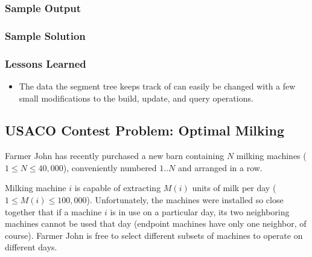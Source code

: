 \subsubsection{Sample Output}


\subsubsection{Sample Solution}




\subsubsection{Lessons Learned}

\begin{itemize}
    \item The data the segment tree keeps track of can easily be changed with a few small modifications to the build, update, and query operations.
\end{itemize}



\subsection{USACO Contest Problem: Optimal Milking\cite{optimalmilking}}

Farmer John has recently purchased a new barn containing $N$ milking machines ($1 \leq N \leq 40,000$), conveniently numbered $1$..$N$ and arranged in a row.

Milking machine $i$ is capable of extracting $M(i)$ units of milk per day ($1 \leq
M(i) \leq 100,000$).
Unfortunately, the machines were installed so close together that if a machine $i$ is in use on a particular day, its two neighboring machines cannot be used that day (endpoint machines have only one neighbor, of course).
Farmer John is free to select different subsets of machines to operate on different days.

